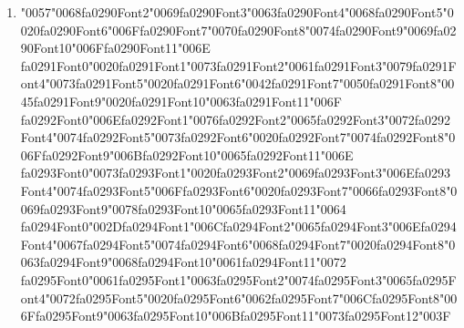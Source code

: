 \documentclass[12pt]{article}
\begin{document}
\begin{enumerate}[label=Q\arabic*.]
 \item {\char"0057}{\char"0068}{\csname fa0290Font2\endcsname\char"0069}{\csname fa0290Font3\endcsname\char"0063}{\csname fa0290Font4\endcsname\char"0068}{\csname fa0290Font5\endcsname\char"0020}{\csname fa0290Font6\endcsname\char"006F}{\csname fa0290Font7\endcsname\char"0070}{\csname fa0290Font8\endcsname\char"0074}{\csname fa0290Font9\endcsname\char"0069}{\csname fa0290Font10\endcsname\char"006F}{\csname fa0290Font11\endcsname\char"006E} {\csname fa0291Font0\endcsname\char"0020}{\csname fa0291Font1\endcsname\char"0073}{\csname fa0291Font2\endcsname\char"0061}{\csname fa0291Font3\endcsname\char"0079}{\csname fa0291Font4\endcsname\char"0073}{\csname fa0291Font5\endcsname\char"0020}{\csname fa0291Font6\endcsname\char"0042}{\csname fa0291Font7\endcsname\char"0050}{\csname fa0291Font8\endcsname\char"0045}{\csname fa0291Font9\endcsname\char"0020}{\csname fa0291Font10\endcsname\char"0063}{\csname fa0291Font11\endcsname\char"006F} {\csname fa0292Font0\endcsname\char"006E}{\csname fa0292Font1\endcsname\char"0076}{\csname fa0292Font2\endcsname\char"0065}{\csname fa0292Font3\endcsname\char"0072}{\csname fa0292Font4\endcsname\char"0074}{\csname fa0292Font5\endcsname\char"0073}{\csname fa0292Font6\endcsname\char"0020}{\csname fa0292Font7\endcsname\char"0074}{\csname fa0292Font8\endcsname\char"006F}{\csname fa0292Font9\endcsname\char"006B}{\csname fa0292Font10\endcsname\char"0065}{\csname fa0292Font11\endcsname\char"006E} {\csname fa0293Font0\endcsname\char"0073}{\csname fa0293Font1\endcsname\char"0020}{\csname fa0293Font2\endcsname\char"0069}{\csname fa0293Font3\endcsname\char"006E}{\csname fa0293Font4\endcsname\char"0074}{\csname fa0293Font5\endcsname\char"006F}{\csname fa0293Font6\endcsname\char"0020}{\csname fa0293Font7\endcsname\char"0066}{\csname fa0293Font8\endcsname\char"0069}{\csname fa0293Font9\endcsname\char"0078}{\csname fa0293Font10\endcsname\char"0065}{\csname fa0293Font11\endcsname\char"0064} {\csname fa0294Font0\endcsname\char"002D}{\csname fa0294Font1\endcsname\char"006C}{\csname fa0294Font2\endcsname\char"0065}{\csname fa0294Font3\endcsname\char"006E}{\csname fa0294Font4\endcsname\char"0067}{\csname fa0294Font5\endcsname\char"0074}{\csname fa0294Font6\endcsname\char"0068}{\csname fa0294Font7\endcsname\char"0020}{\csname fa0294Font8\endcsname\char"0063}{\csname fa0294Font9\endcsname\char"0068}{\csname fa0294Font10\endcsname\char"0061}{\csname fa0294Font11\endcsname\char"0072} {\csname fa0295Font0\endcsname\char"0061}{\csname fa0295Font1\endcsname\char"0063}{\csname fa0295Font2\endcsname\char"0074}{\csname fa0295Font3\endcsname\char"0065}{\csname fa0295Font4\endcsname\char"0072}{\csname fa0295Font5\endcsname\char"0020}{\csname fa0295Font6\endcsname\char"0062}{\csname fa0295Font7\endcsname\char"006C}{\csname fa0295Font8\endcsname\char"006F}{\csname fa0295Font9\endcsname\char"0063}{\csname fa0295Font10\endcsname\char"006B}{\csname fa0295Font11\endcsname\char"0073}{\csname fa0295Font12\endcsname\char"003F}

\end{enumerate}
\end{document}

